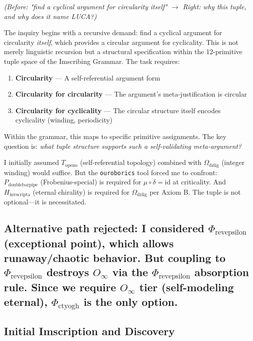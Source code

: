 \documentclass[12pt,a4paper]{article}
\begin{document}
\emph{(Before: "find a cyclical argument for circularity itself" $\rightarrow$ Right: why this tuple, and why does it name LUCA?)}

The inquiry begins with a recursive demand: find a cyclical argument for circularity \emph{itself}, which provides a circular argument for cyclicality. This is not merely linguistic recursion but a structural specification within the 12-primitive tuple space of the Imscribing Grammar. The task requires:

\begin{enumerate}
    \item \textbf{Circularity} --- A self-referential argument form
    \item \textbf{Circularity for circularity} --- The argument's meta-justification is circular
    \item \textbf{Circularity for cyclicality} --- The circular structure itself encodes cyclicality (winding, periodicity)
\end{enumerate}

Within the grammar, this maps to specific primitive assignments. The key question is: \emph{what tuple structure supports such a self-validating meta-argument?}

I initially assumed $T_{\text{openo}}$ (self-referential topology) combined with $\Omega_{\text{dzlig}}$ (integer winding) would suffice. But the \texttt{ouroborics} tool forced me to confront: $P_{\text{doublebarpipe}}$ (Frobenius-special) is required for $\mu \circ \delta = \text{id}$ at criticality. And $H_{\text{invscripta}}$ (eternal chirality) is required for $\Omega_{\text{dzlig}}$ per Axiom B. The tuple is not optional---it is necessitated.

\subsection{\textbf{Alternative path rejected}: I considered $\Phi_{\text{revepsilon}}$ (exceptional point), which allows runaway/chaotic behavior. But coupling to $\Phi_{\text{revepsilon}}$ destroys $O_{\infty}$ via the \textbf{$\Phi_{\text{revepsilon}}$ absorption rule}. Since we require $O_{\infty}$ tier (self-modeling eternal), $\Phi_{\text{ctyogh}}$ is the only option.}

\subsection{Initial Imscription and Discovery}
\end{document}
